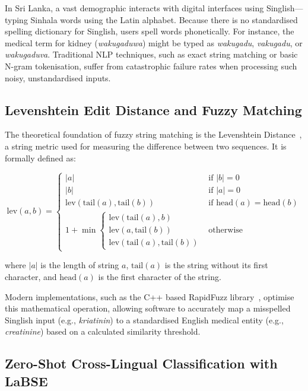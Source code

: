 \documentclass[12pt,a4paper]{report}
\begin{document}
In Sri Lanka, a vast demographic interacts with digital interfaces using Singlish---typing Sinhala words using the Latin alphabet. Because there is no standardised spelling dictionary for Singlish, users spell words phonetically. For instance, the medical term for kidney (\textit{wakugaduwa}) might be typed as \textit{wakugadu}, \textit{vakugadu}, or \textit{wakugaduva}. Traditional NLP techniques, such as exact string matching or basic N-gram tokenisation, suffer from catastrophic failure rates when processing such noisy, unstandardised inputs.

\subsection{Levenshtein Edit Distance and Fuzzy Matching}

The theoretical foundation of fuzzy string matching is the Levenshtein Distance~\cite{Levenshtein1966}, a string metric used for measuring the difference between two sequences. It is formally defined as:

\begin{equation}
\text{lev}(a, b) = \begin{cases}
|a| & \text{if } |b| = 0 \\
|b| & \text{if } |a| = 0 \\
\text{lev}(\text{tail}(a), \text{tail}(b)) & \text{if head}(a) = \text{head}(b) \\
1 + \min \begin{cases}
  \text{lev}(\text{tail}(a), b) \\
  \text{lev}(a, \text{tail}(b)) \\
  \text{lev}(\text{tail}(a), \text{tail}(b))
\end{cases} & \text{otherwise}
\end{cases}
\end{equation}

where $|a|$ is the length of string $a$, $\text{tail}(a)$ is the string without its first character, and $\text{head}(a)$ is the first character of the string.

Modern implementations, such as the C++ based RapidFuzz library~\cite{Maxmilian2023}, optimise this mathematical operation, allowing software to accurately map a misspelled Singlish input (e.g., \textit{kriatinin}) to a standardised English medical entity (e.g., \textit{creatinine}) based on a calculated similarity threshold.

\subsection{Zero-Shot Cross-Lingual Classification with LaBSE}
\end{document}
